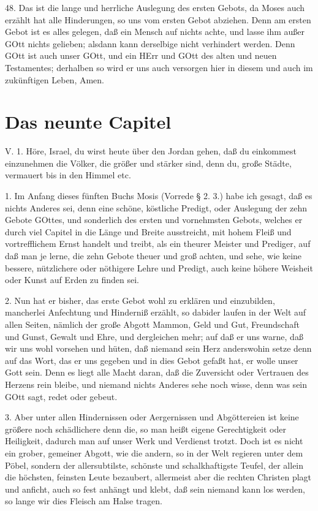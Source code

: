 48. Das ist die lange und herrliche Auslegung des ersten Gebots, da Moses auch erzählt hat alle Hinderungen, so uns vom ersten Gebot abziehen. Denn am ersten Gebot ist es alles gelegen, daß ein Mensch auf nichts achte, und lasse ihm außer GOtt nichts gelieben; alsdann kann derselbige nicht verhindert werden. Denn GOtt ist auch unser GOtt, und ein HErr und GOtt des alten und neuen Testamentes; derhalben so wird er uns auch versorgen hier in diesem und auch im zukünftigen Leben, Amen.

\section{Das neunte Capitel}

\begin{schriftzitat}
V. 1. Höre, Israel, du wirst heute über den Jordan gehen, daß du einkommest einzunehmen die Völker, die größer und stärker sind, denn du, große Städte, vermauert bis in den Himmel etc.
\end{schriftzitat}

1. Im Anfang dieses fünften Buchs Mosis (Vorrede § 2. 3.) habe ich gesagt, daß es nichts Anderes sei, denn eine schöne, köstliche Predigt, oder Auslegung der zehn Gebote GOttes, und sonderlich des ersten und vornehmsten Gebots, welches er durch viel Capitel in die Länge und Breite ausstreicht, mit hohem Fleiß und vortrefflichem Ernst handelt und treibt, als ein theurer Meister und Prediger, auf daß man je lerne, die zehn Gebote theuer und groß achten, und sehe, wie keine bessere, nützlichere oder nöthigere Lehre und Predigt, auch keine höhere Weisheit oder Kunst auf Erden zu finden sei.

2. Nun hat er bisher, das erste Gebot wohl zu erklären und einzubilden, mancherlei Anfechtung und Hinderniß erzählt, so dabider laufen in der Welt auf allen Seiten, nämlich der große Abgott Mammon, Geld und Gut, Freundschaft und Gunst, Gewalt und Ehre, und dergleichen mehr; auf daß er uns warne, daß wir uns wohl vorsehen und hüten, daß niemand sein Herz anderswohin setze denn auf das Wort, das er uns gegeben und in dies Gebot gefaßt hat, er wolle unser Gott sein. Denn es liegt alle Macht daran, daß die Zuversicht oder Vertrauen des Herzens rein bleibe, und niemand nichts Anderes sehe noch wisse, denn was sein GOtt sagt, redet oder gebeut.

3. Aber unter allen Hindernissen oder Aergernissen und Abgöttereien ist keine größere noch schädlichere denn die, so man heißt eigene Gerechtigkeit oder Heiligkeit, dadurch man auf unser Werk und Verdienst trotzt. Doch ist es nicht ein grober, gemeiner Abgott, wie die andern, so in der Welt regieren unter dem Pöbel, sondern der allersubtilste, schönste und schalkhaftigste Teufel, der allein die höchsten, feinsten Leute bezaubert, allermeist aber die rechten Christen plagt und anficht, auch so fest anhängt und klebt, daß sein niemand kann los werden, so lange wir dies Fleisch am Halse tragen.

